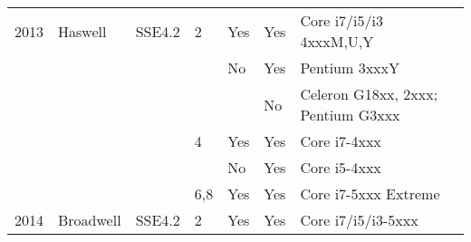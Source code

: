 \begin{longtable}{lllllll}
2013 & Haswell      & SSE4.2      & 2     & Yes & Yes    & Core i7/i5/i3 4xxxM,U,Y                          \\
     &              &             &       & No  & Yes    & Pentium 3xxxY                                    \\
     &              &             &       &     & No     & Celeron G18xx, 2xxx; Pentium G3xxx               \\
     &              &             & 4     & Yes & Yes    & Core i7-4xxx                                     \\
     &              &             &       & No  & Yes    & Core i5-4xxx                                     \\
     &              &             & 6,8   & Yes & Yes    & Core i7-5xxx Extreme                             \\
2014 & Broadwell    & SSE4.2      & 2     & Yes & Yes    & Core i7/i5/i3-5xxx                              
\end{longtable}